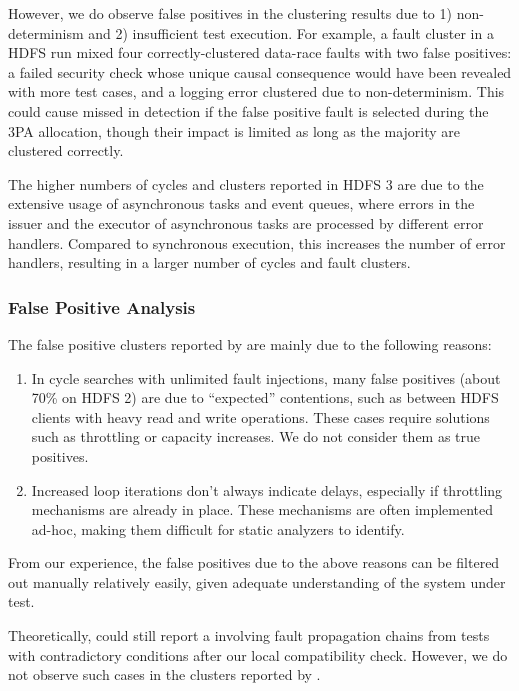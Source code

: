 However, we do observe false positives in the clustering results due to 1) non-determinism and 2) insufficient test execution. For example, a fault cluster in a HDFS run mixed four correctly-clustered data-race faults with two false positives: a failed security check whose unique causal consequence would have been revealed with more test cases, and a logging error clustered due to non-determinism. This could cause missed \vcs in detection if the false positive fault is selected during the 3PA allocation, though their impact is limited as long as the majority are clustered correctly.

The higher numbers of cycles and clusters reported in HDFS 3 are due to the extensive usage of asynchronous tasks and event queues, 
where 
errors in the issuer 
and the executor of asynchronous tasks 
are processed by different error handlers. 
Compared to synchronous execution, 
this 
increases the number of error handlers, 
resulting in 
a larger number of 
cycles and fault clusters.

\subsubsection{False Positive Analysis}

The false positive clusters reported by \tool are mainly due to the following reasons:
\begin{enumerate}[wide, labelwidth=!, labelindent=\parindent, noitemsep, topsep=0pt]
\item 
In cycle searches with unlimited fault injections, many false positives (about 70\% on HDFS 2) are due to ``expected'' contentions, such as between HDFS clients with heavy read and write operations. These cases require solutions such as throttling or capacity increases. 
We do not consider them as true positives. 

\item 
Increased loop iterations don't always indicate delays, especially if throttling mechanisms are already in place. These mechanisms are often implemented ad-hoc, making them difficult for static analyzers to identify.

\end{enumerate}

From our experience, 
the false positives 
due to the above reasons can be 
filtered out manually 
relatively easily, 
given adequate understanding of the system under test. 

Theoretically, \tool could still report a \vc involving fault propagation chains from tests with contradictory conditions after our local compatibility check. However, we do not observe such cases in the clusters reported by \tool.


